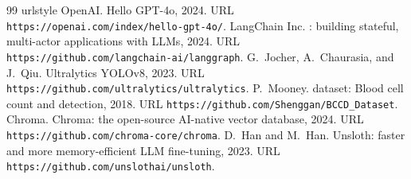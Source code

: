 {\begin{thebibliography}{99}
\providecommand{\natexlab}[1]{#1}
\providecommand{\url}[1]{\texttt{#1}}
\expandafter\ifx\csname urlstyle\endcsname\relax
  \providecommand{\doi}[1]{doi: #1}\else
  \providecommand{\doi}{doi: \begingroup \urlstyle{rm}\Url}\fi
\setcounter{enumiv}{32}\setcounter{NAT@ctr}{32}
{OpenAI}.
\newblock Hello {GPT-4o}, 2024.
\newblock URL \url{https://openai.com/index/hello-gpt-4o/}.
{LangChain Inc.}
: building stateful, multi-actor applications with {LLMs},
  2024.
\newblock URL \url{https://github.com/langchain-ai/langgraph}.
G.~Jocher, A.~Chaurasia, and J.~Qiu.
\newblock Ultralytics {YOLOv8}, 2023.
\newblock URL \url{https://github.com/ultralytics/ultralytics}.
P.~Mooney.
 dataset: Blood cell count and detection, 2018.
\newblock URL \url{https://github.com/Shenggan/BCCD_Dataset}.
{Chroma}.
\newblock Chroma: the open-source {AI}-native vector database, 2024.
\newblock URL \url{https://github.com/chroma-core/chroma}.
D.~Han and M.~Han.
\newblock Unsloth: faster and more memory-efficient {LLM} fine-tuning, 2023.
\newblock URL \url{https://github.com/unslothai/unsloth}.
\end{thebibliography}

}
